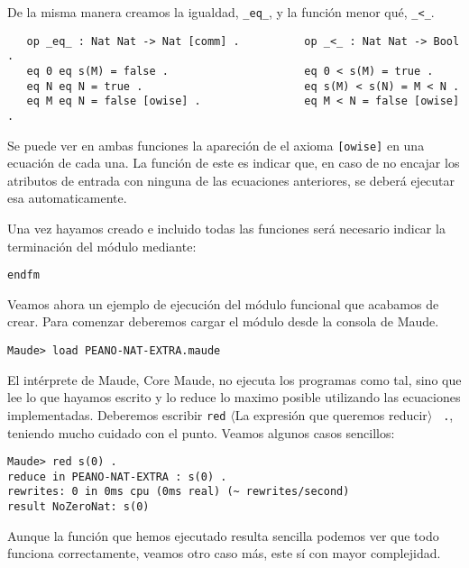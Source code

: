 De la misma manera creamos la igualdad, \verb"_eq_", y la función menor qué, \verb"_<_".\par

{\codesize
\begin{verbatim}
   op _eq_ : Nat Nat -> Nat [comm] .          op _<_ : Nat Nat -> Bool .
   eq 0 eq s(M) = false .                     eq 0 < s(M) = true .
   eq N eq N = true .                         eq s(M) < s(N) = M < N .
   eq M eq N = false [owise] .                eq M < N = false [owise] .
\end{verbatim}
}
Se puede ver en ambas funciones la apareción de el axioma \verb"[owise]" en una ecuación de cada una. La función de este es indicar que, en caso de no encajar los atributos de entrada con ninguna de las ecuaciones anteriores, se deberá ejecutar esa automaticamente. \par

Una vez hayamos creado e incluido todas las funciones será necesario indicar la terminación del módulo mediante: \par

{\codesize
\begin{verbatim}
endfm
\end{verbatim}
}

Veamos ahora un ejemplo de ejecución del módulo funcional que acabamos de crear. Para comenzar deberemos cargar el módulo desde la consola de Maude.\par

{\codesize
\begin{verbatim}
Maude> load PEANO-NAT-EXTRA.maude
\end{verbatim}
}

El intérprete de Maude, Core Maude, no ejecuta los programas como tal, sino que lee lo que hayamos escrito y lo reduce lo maximo posible utilizando las ecuaciones implementadas. Deberemos escribir \texttt{red} $\langle$La expresión que queremos reducir$\rangle$ \verb" .", teniendo mucho cuidado con el punto. Veamos algunos casos sencillos:
{\codesize
\begin{verbatim}
Maude> red s(0) .
reduce in PEANO-NAT-EXTRA : s(0) .
rewrites: 0 in 0ms cpu (0ms real) (~ rewrites/second)
result NoZeroNat: s(0)
\end{verbatim}
}

Aunque la función que hemos ejecutado resulta sencilla podemos ver que todo funciona correctamente, veamos otro caso más, este sí con mayor complejidad.\par

